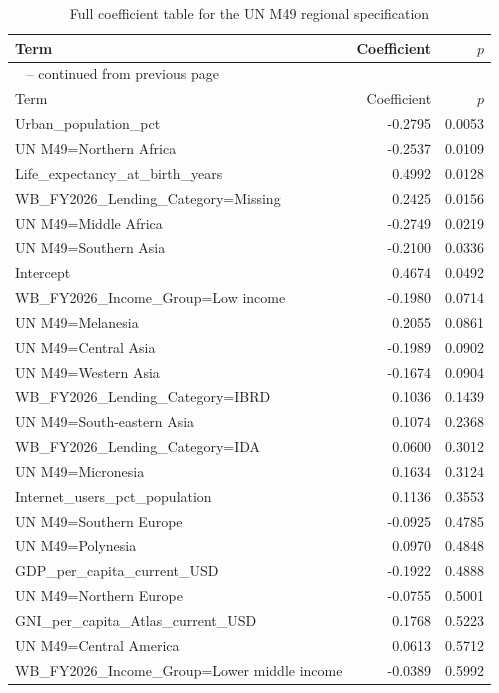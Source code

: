 \documentclass[runningheads]{llncs}
\begin{document}
{\scriptsize
\renewcommand{\arraystretch}{1.15}
\setlength{\tabcolsep}{8pt}
\begin{longtable}{p{}r@{\hspace{1.5em}}r}
\caption{Full coefficient table for the UN M49 regional specification}\label{tab:appendix-coefficients-un-m49}\\
\hline
Term & Coefficient & $p$ \\
\hline
\endfirsthead
\multicolumn{3}{l}{\tablename\ \thetable{} -- continued from previous page}\\
\hline
Term & Coefficient & $p$ \\
\hline
\endhead
Urban\_population\_pct & -0.2795 & 0.0053 \\
UN M49=Northern Africa & -0.2537 & 0.0109 \\
Life\_expectancy\_at\_birth\_years & 0.4992 & 0.0128 \\
WB\_FY2026\_Lending\_Category=Missing & 0.2425 & 0.0156 \\
UN M49=Middle Africa & -0.2749 & 0.0219 \\
UN M49=Southern Asia & -0.2100 & 0.0336 \\
Intercept & 0.4674 & 0.0492 \\
WB\_FY2026\_Income\_Group=Low income & -0.1980 & 0.0714 \\
UN M49=Melanesia & 0.2055 & 0.0861 \\
UN M49=Central Asia & -0.1989 & 0.0902 \\
UN M49=Western Asia & -0.1674 & 0.0904 \\
WB\_FY2026\_Lending\_Category=IBRD & 0.1036 & 0.1439 \\
UN M49=South-eastern Asia & 0.1074 & 0.2368 \\
WB\_FY2026\_Lending\_Category=IDA & 0.0600 & 0.3012 \\
UN M49=Micronesia & 0.1634 & 0.3124 \\
Internet\_users\_pct\_population & 0.1136 & 0.3553 \\
UN M49=Southern Europe & -0.0925 & 0.4785 \\
UN M49=Polynesia & 0.0970 & 0.4848 \\
GDP\_per\_capita\_current\_USD & -0.1922 & 0.4888 \\
UN M49=Northern Europe & -0.0755 & 0.5001 \\
GNI\_per\_capita\_Atlas\_current\_USD & 0.1768 & 0.5223 \\
UN M49=Central America & 0.0613 & 0.5712 \\
WB\_FY2026\_Income\_Group=Lower middle income & -0.0389 & 0.5992 \\

\end{longtable}}
\end{document}
